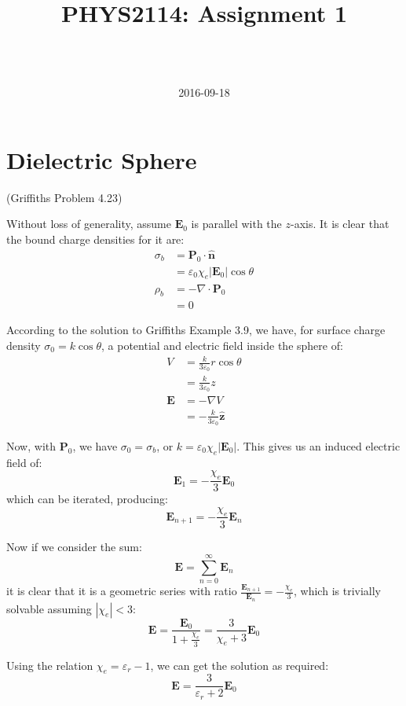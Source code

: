 \documentclass[a4paper]{scrartcl}
\begin{document}
\title{PHYS2114: Assignment 1}
\author{ \\ \\ }
\date{2016-09-18}
\maketitle

\section{Dielectric Sphere}
(Griffiths Problem 4.23)

Without loss of generality, assume \(\mathbf{E}_0\) is parallel with the \(z\)-axis. It is clear that the bound charge densities for it are:
\begin{align*}
    \sigma_b &= \mathbf{P}_0 \cdot \hat{\mathbf{n}} \\
    &= \varepsilon_0 \chi_e |\mathbf{E}_0| \cos \theta \\
    \rho_b &= -\nabla \cdot \mathbf{P}_0 \\
    &= 0
\end{align*}

According to the solution to Griffiths Example 3.9, we have, for surface charge density \(\sigma_0 = k \cos \theta\), a potential and electric field inside the sphere of:
\begin{align*}
    V &= \frac{k}{3 \varepsilon_0} r \cos \theta \\
    &= \frac{k}{3 \varepsilon_0} z \\
    \mathbf{E} &= -\nabla V \\
    &= -\frac{k}{3 \varepsilon_0} \hat{\mathbf{z}}
\end{align*}

Now, with \(\mathbf{P}_0\), we have \(\sigma_0 = \sigma_b\), or \(k = \varepsilon_0 \chi_e |\mathbf{E}_0|\). This gives us an induced electric field of:
\[\mathbf{E}_1 = -\frac{\chi_e}{3} \mathbf{E}_0\]
which can be iterated, producing:
\[\mathbf{E}_{n + 1} = -\frac{\chi_e}{3} \mathbf{E}_n\]

Now if we consider the sum:
\[\mathbf{E} = \sum_{n = 0}^\infty \mathbf{E}_n\]
it is clear that it is a geometric series with ratio \(\frac{\mathbf{E}_{n + 1}}{\mathbf{E}_n} = -\frac{\chi_e}{3}\), which is trivially solvable assuming \(|\chi_e| < 3\):
\[\mathbf{E} = \frac{\mathbf{E}_0}{1 + \frac{\chi_e}{3}} = \frac{3}{\chi_e + 3} \mathbf{E}_0\]

Using the relation \(\chi_e = \varepsilon_r - 1\), we can get the solution as required:
\[\mathbf{E} = \frac{3}{\varepsilon_r + 2} \mathbf{E}_0\]
\end{document}
